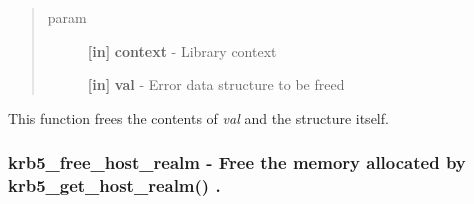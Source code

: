 \documentclass[letterpaper,10pt,english]{sphinxmanual}
\begin{document}
\begin{fulllineitems}
\label{appdev/refs/api/krb5_free_error:krb5_free_error}
\end{fulllineitems}

\begin{quote}\begin{description}
\item[{param}] \leavevmode
\textbf{{[}in{]}} \textbf{context} - Library context

\textbf{{[}in{]}} \textbf{val} - Error data structure to be freed

\end{description}\end{quote}

This function frees the contents of \emph{val} and the structure itself.


\subsubsection{krb5\_free\_host\_realm -  Free the memory allocated by krb5\_get\_host\_realm() .}
\label{appdev/refs/api/krb5_free_host_realm::doc}\label{appdev/refs/api/krb5_free_host_realm:krb5-free-host-realm-free-the-memory-allocated-by-krb5-get-host-realm}

\begin{fulllineitems}
\label{appdev/refs/api/krb5_free_host_realm:krb5_free_host_realm}
\end{fulllineitems}
\end{document}
